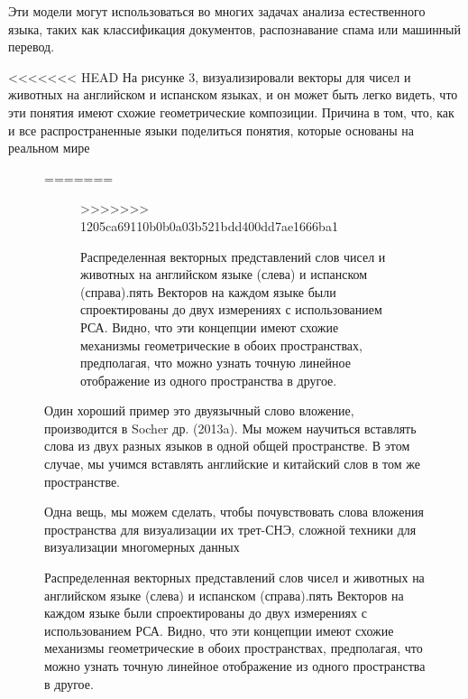\documentclass[12pt]{article}
\begin{document}
Эти модели могут использоваться во многих задачах анализа естественного языка, таких как классификация документов, распознавание спама или машинный перевод.

<<<<<<< HEAD
На рисунке 3, визуализировали векторы для чисел и животных на английском и испанском языках, и он может быть легко видеть, что эти понятия имеют схожие геометрические композиции. Причина в том, что, как и все распространенные языки поделиться понятия, которые основаны на реальном мире
	\begin{figure}[h]
=======
	\begin{figure}[H]
>>>>>>> 1205ca69110b0b0a03b521bdd400dd7ae1666ba1
		\noindent{}
		\caption{Распределенная векторных представлений слов чисел и животных на английском языке (слева) и испанском (справа).пять Векторов на каждом языке были спроектированы до двух измерениях с использованием РСА. Видно, что эти концепции имеют схожие механизмы геометрические в обоих пространствах, предполагая, что можно узнать точную линейное отображение из одного пространства в другое.}
		\label{figCurves}
	\end{figure}

Один хороший пример это двуязычный слово вложение, производится в Socher др. (2013a). Мы можем научиться вставлять слова из двух разных языков в одной общей пространстве. В этом случае, мы учимся вставлять английские и китайский слов в том же пространстве.

Одна вещь, мы можем сделать, чтобы почувствовать слова вложения пространства для визуализации их трет-СНЭ, сложной техники для визуализации многомерных данных


\end{figure}
\end{document}
